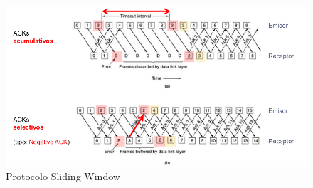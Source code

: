 \begin{figure}[H]
	\centering
	\includegraphics[width=\textwidth
]{images/sliding-window.png}
	\caption[Protocolo Sliding Window]{Protocolo Sliding Window}
	\label{fig:sliding-window}
\end{figure}
